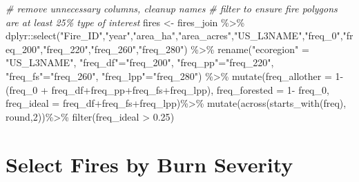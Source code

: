 \documentclass[
]{book}
\newenvironment{Shaded}{\begin{snugshade}}{\end{snugshade}}
\newcommand{\AttributeTok}[1]{\textcolor[rgb]{0.77,0.63,0.00}{#1}}
\newcommand{\CommentTok}[1]{\textcolor[rgb]{0.56,0.35,0.01}{\textit{#1}}}
\newcommand{\DecValTok}[1]{\textcolor[rgb]{0.00,0.00,0.81}{#1}}
\newcommand{\FloatTok}[1]{\textcolor[rgb]{0.00,0.00,0.81}{#1}}
\newcommand{\FunctionTok}[1]{\textcolor[rgb]{0.00,0.00,0.00}{#1}}
\newcommand{\NormalTok}[1]{#1}
\newcommand{\OtherTok}[1]{\textcolor[rgb]{0.56,0.35,0.01}{#1}}
\newcommand{\SpecialCharTok}[1]{\textcolor[rgb]{0.00,0.00,0.00}{#1}}
\newcommand{\StringTok}[1]{\textcolor[rgb]{0.31,0.60,0.02}{#1}}
\begin{document}
\begin{Shaded}
\begin{Highlighting}[]
\CommentTok{\# remove unnecessary columns, cleanup names}
\CommentTok{\# filter to ensure fire polygons are at least 25\% type of interest}
\NormalTok{fires }\OtherTok{\textless{}{-}}\NormalTok{ fires\_join }\SpecialCharTok{\%\textgreater{}\%} 
\NormalTok{  dplyr}\SpecialCharTok{::}\FunctionTok{select}\NormalTok{(}\StringTok{"Fire\_ID"}\NormalTok{,}\StringTok{"year"}\NormalTok{,}\StringTok{"area\_ha"}\NormalTok{,}\StringTok{"area\_acres"}\NormalTok{,}\StringTok{"US\_L3NAME"}\NormalTok{,}\StringTok{"freq\_0"}\NormalTok{,}\StringTok{"freq\_200"}\NormalTok{,}\StringTok{"freq\_220"}\NormalTok{,}\StringTok{"freq\_260"}\NormalTok{,}\StringTok{"freq\_280"}\NormalTok{) }\SpecialCharTok{\%\textgreater{}\%} 
  \FunctionTok{rename}\NormalTok{(}\StringTok{"ecoregion"} \OtherTok{=} \StringTok{"US\_L3NAME"}\NormalTok{,}
         \StringTok{"freq\_df"}\OtherTok{=}\StringTok{"freq\_200"}\NormalTok{,}
         \StringTok{"freq\_pp"}\OtherTok{=}\StringTok{"freq\_220"}\NormalTok{,}
         \StringTok{"freq\_fs"}\OtherTok{=}\StringTok{"freq\_260"}\NormalTok{,}
         \StringTok{"freq\_lpp"}\OtherTok{=}\StringTok{"freq\_280"}\NormalTok{) }\SpecialCharTok{\%\textgreater{}\%} 
  \FunctionTok{mutate}\NormalTok{(}\AttributeTok{freq\_allother =} \DecValTok{1}\SpecialCharTok{{-}}\NormalTok{(freq\_0 }\SpecialCharTok{+}\NormalTok{ freq\_df}\SpecialCharTok{+}\NormalTok{freq\_pp}\SpecialCharTok{+}\NormalTok{freq\_fs}\SpecialCharTok{+}\NormalTok{freq\_lpp),}
         \AttributeTok{freq\_forested =} \DecValTok{1}\SpecialCharTok{{-}}\NormalTok{ freq\_0,}
         \AttributeTok{freq\_ideal =}\NormalTok{ freq\_df}\SpecialCharTok{+}\NormalTok{freq\_fs}\SpecialCharTok{+}\NormalTok{freq\_lpp)}\SpecialCharTok{\%\textgreater{}\%} 
  \FunctionTok{mutate}\NormalTok{(}\FunctionTok{across}\NormalTok{(}\FunctionTok{starts\_with}\NormalTok{(}\StringTok{\textquotesingle{}freq\textquotesingle{}}\NormalTok{), round,}\DecValTok{2}\NormalTok{))}\SpecialCharTok{\%\textgreater{}\%} 
  \FunctionTok{filter}\NormalTok{(freq\_ideal }\SpecialCharTok{\textgreater{}} \FloatTok{0.25}\NormalTok{)}
\end{Highlighting}
\end{Shaded}

\hypertarget{select-fires-by-burn-severity}{%
\section{Select Fires by Burn Severity}\label{select-fires-by-burn-severity}}
\end{document}
